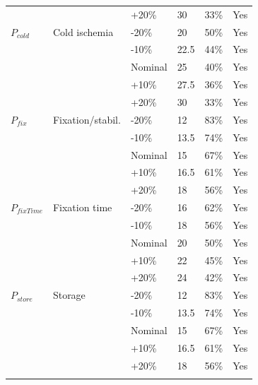 \documentclass[preprint,12pt]{elsarticle}
\begin{document}
\begin{longtable}{@{}C{1.75cm} L{3.25cm} C{1.45cm} R{1.15cm} R{1.25cm} C{1.30cm}@{}}
 &  & +20\% & 30 & 33\% & Yes \\
\addlinespace[0.16em]
$P_{cold}$ & Cold ischemia & -20\% & 20 & 50\% & Yes \\
 &  & -10\% & 22.5 & 44\% & Yes \\
 &  & Nominal & 25 & 40\% & Yes \\
 &  & +10\% & 27.5 & 36\% & Yes \\
 &  & +20\% & 30 & 33\% & Yes \\
\addlinespace[0.16em]
$P_{fix}$ & Fixation/stabil. & -20\% & 12 & 83\% & Yes \\
 &  & -10\% & 13.5 & 74\% & Yes \\
 &  & Nominal & 15 & 67\% & Yes \\
 &  & +10\% & 16.5 & 61\% & Yes \\
 &  & +20\% & 18 & 56\% & Yes \\
\addlinespace[0.16em]
$P_{fixTime}$ & Fixation time & -20\% & 16 & 62\% & Yes \\
 &  & -10\% & 18 & 56\% & Yes \\
 &  & Nominal & 20 & 50\% & Yes \\
 &  & +10\% & 22 & 45\% & Yes \\
 &  & +20\% & 24 & 42\% & Yes \\
\addlinespace[0.16em]
$P_{store}$ & Storage & -20\% & 12 & 83\% & Yes \\
 &  & -10\% & 13.5 & 74\% & Yes \\
 &  & Nominal & 15 & 67\% & Yes \\
 &  & +10\% & 16.5 & 61\% & Yes \\
 &  & +20\% & 18 & 56\% & Yes \\
\addlinespace[0.16em]
\end{longtable}
\normalsize
\end{document}
